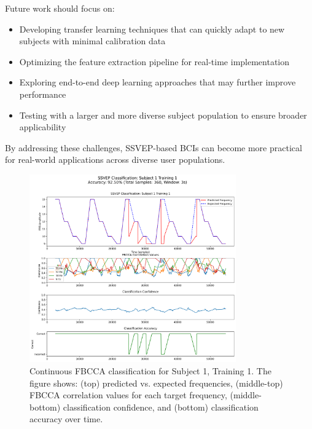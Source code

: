 \documentclass[conference]{IEEEtran}
\begin{document}
Future work should focus on:
\begin{itemize}
    \item Developing transfer learning techniques that can quickly adapt to new subjects with minimal calibration data
    \item Optimizing the feature extraction pipeline for real-time implementation
    \item Exploring end-to-end deep learning approaches that may further improve performance
    \item Testing with a larger and more diverse subject population to ensure broader applicability
\end{itemize}

By addressing these challenges, SSVEP-based BCIs can become more practical for real-world applications across diverse user populations.

\begin{figure}[!t]
\centering
\includegraphics[width=3.5in]{images/prediction_visualization_subject_1_training_1.png}
\caption{Continuous FBCCA classification for Subject 1, Training 1. The figure shows: (top) predicted vs. expected frequencies, (middle-top) FBCCA correlation values for each target frequency, (middle-bottom) classification confidence, and (bottom) classification accuracy over time.}
\label{fig:sub1_fbcca}
\end{figure}
\end{document}
